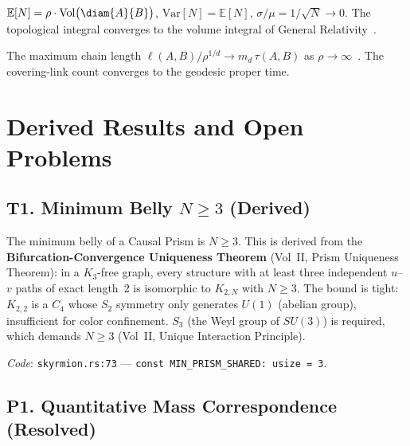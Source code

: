 \begin{theorem}
\label{thm:app-poisson-vol}
$\mathbb{E}[N] = \rho \cdot \mathrm{Vol}\bigl(\diam{A}{B}\bigr)$,
$\mathrm{Var}[N] = \mathbb{E}[N]$, $\sigma/\mu = 1/\sqrt{N}
\to 0$. The topological integral converges to the volume
integral of General Relativity~\cite{bombelli1987}.
\end{theorem}

\begin{theorem}
\label{thm:app-mm}
The maximum chain length
$\ell(A,B)/\rho^{1/d} \to m_d\,\tau(A,B)$ as
$\rho \to \infty$~\cite{myrheim1978,brightwell1991}. The
covering-link count converges to the geodesic proper
time.
\end{theorem}

\section{Derived Results and Open Problems}

\subsection*{T1. Minimum Belly $N \geq 3$ (Derived)}
\label{thm-ref:min-belly}

The minimum belly of a Causal Prism is $N \geq 3$. This is
derived from the \textbf{Bifurcation-Convergence Uniqueness Theorem}
(Vol~II, Prism Uniqueness Theorem): in a $K_3$-free graph,
every structure with at least three independent $u$--$v$ paths of
exact length~2 is isomorphic to $K_{2,N}$ with $N \geq 3$. The bound is
tight: $K_{2,2}$ is a $C_4$ whose $S_2$ symmetry only generates
$U(1)$ (abelian group), insufficient for color confinement.
$S_3$ (the Weyl group of $SU(3)$) is required, which demands $N \geq 3$
(Vol~II, Unique Interaction Principle).

\medskip\noindent
\textit{Code}: \texttt{skyrmion.rs:73} ---
\texttt{const MIN\_PRISM\_SHARED: usize = 3}.

\subsection*{P1. Quantitative Mass Correspondence (Resolved)}
\label{open:mass-ratios}

